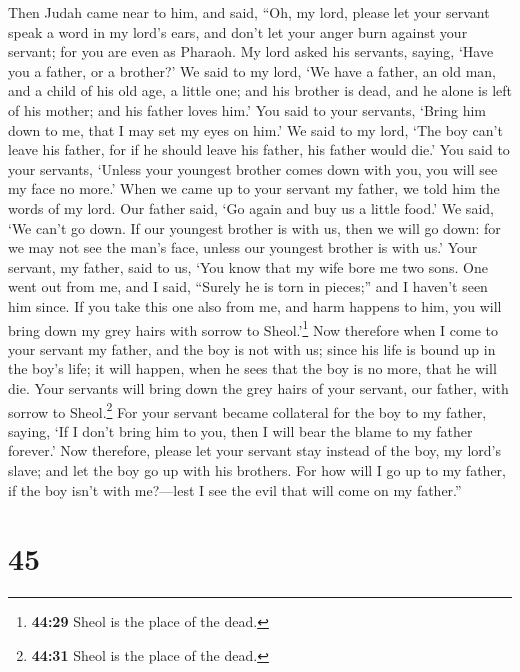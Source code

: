  Then Judah came near to him, and said, ``Oh, my lord,
please let your servant speak a word in my lord's ears, and don't let
your anger burn against your servant; for you are even as Pharaoh.
 My lord asked his servants, saying, `Have you a father,
or a brother?'  We said to my lord, `We have a father, an
old man, and a child of his old age, a little one; and his brother is
dead, and he alone is left of his mother; and his father loves him.'
 You said to your servants, `Bring him down to me, that I
may set my eyes on him.'  We said to my lord, `The boy
can't leave his father, for if he should leave his father, his father
would die.'  You said to your servants, `Unless your
youngest brother comes down with you, you will see my face no more.'
 When we came up to your servant my father, we told him
the words of my lord.  Our father said, `Go again and buy
us a little food.'  We said, `We can't go down. If our
youngest brother is with us, then we will go down: for we may not see
the man's face, unless our youngest brother is with us.' 
Your servant, my father, said to us, `You know that my wife bore me two
sons.  One went out from me, and I said, ``Surely he is
torn in pieces;'' and I haven't seen him since.  If you
take this one also from me, and harm happens to him, you will bring down
my grey hairs with sorrow to Sheol.'\footnote{\textbf{44:29} Sheol is
  the place of the dead.}  Now therefore when I come to
your servant my father, and the boy is not with us; since his life is
bound up in the boy's life;  it will happen, when he sees
that the boy is no more, that he will die. Your servants will bring down
the grey hairs of your servant, our father, with sorrow to
Sheol.\footnote{\textbf{44:31} Sheol is the place of the dead.}
 For your servant became collateral for the boy to my
father, saying, `If I don't bring him to you, then I will bear the blame
to my father forever.'  Now therefore, please let your
servant stay instead of the boy, my lord's slave; and let the boy go up
with his brothers.  For how will I go up to my father, if
the boy isn't with me?---lest I see the evil that will come on my
father.''

\hypertarget{section-44}{%
\section{45}\label{section-44}}


